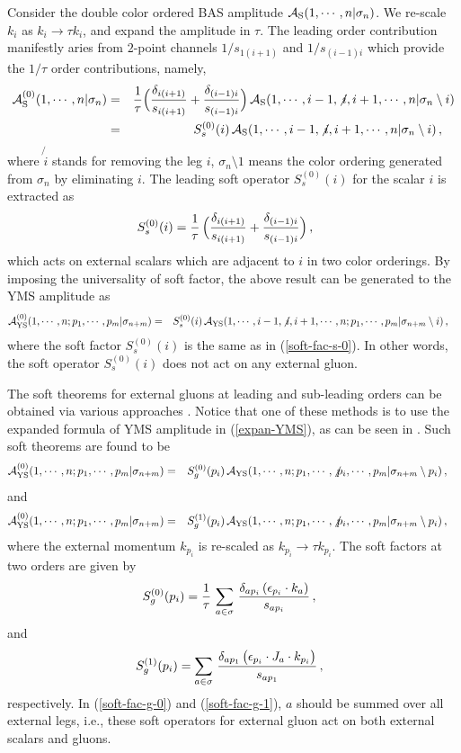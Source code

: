 \documentclass[11pt,a4paper]{article}
\newcommand{\bea}{\begin{eqnarray}}
\newcommand{\eea}{\end{eqnarray}}
\newcommand{\nn}{\nonumber \\}
\def\eref#1{(\ref{#1})}
\begin{document}
Consider the double color ordered BAS amplitude ${\cal A}_{\rm S}(1,\cdots,n|\sigma_n)$. We re-scale $k_i$
as $k_i\to\tau k_i$, and expand the amplitude in $\tau$. The leading order contribution manifestly aries from $2$-point channels $1/s_{1(i+1)}$
and $1/ s_{(i-1)i}$ which provide the $1/\tau$ order contributions, namely,
%
\bea
{\cal A}^{(0)}_{\rm S}(1,\cdots,n|\sigma_n)&=&{1\over \tau}\Big({\delta_{i(i+1)}\over s_{i(i+1)}}+{\delta_{(i-1)i}\over s_{(i-1)i}}\Big)\,
{\cal A}_{\rm S}(1,\cdots,i-1,\not{i},i+1,\cdots,n|\sigma_n\setminus i)\nn
&=&S^{(0)}_s(i)\,{\cal A}_{\rm S}(1,\cdots,i-1,\not{i},i+1,\cdots,n|\sigma_n\setminus i)\,,~~~\label{soft-theo-s}
\eea
%
where $\not{i}$ stands for removing the leg $i$, $\sigma_n\setminus1$ means the color ordering generated from $\sigma_n$ by eliminating $i$. The leading soft operator $S^{(0)}_s(i)$ for the scalar $i$ is extracted as
%
\bea
S^{(0)}_s(i)={1\over \tau}\,\Big({\delta_{i(i+1)}\over s_{i(i+1)}}+{\delta_{(i-1)i}\over s_{(i-1)i}}\Big)\,,~~~~\label{soft-fac-s-0}
\eea
%
which acts on external scalars which are adjacent to $i$ in two color orderings.
By imposing the universality of soft factor, the above result can be generated to the YMS amplitude as
%
\bea
{\cal A}^{(0)}_{\rm YS}(1,\cdots,n;p_1,\cdots,p_m|\sigma_{n+m})
&=&S^{(0)}_s(i)\,{\cal A}_{\rm YS}(1,\cdots,i-1,\not{i},i+1,\cdots,n;p_1,\cdots,p_m|\sigma_{n+m}\setminus i)\,,~~~\label{soft-theo-s}
\eea
%
where the soft factor $S^{(0)}_s(i)$ is the same as in \eref{soft-fac-s-0}. In other words, the soft operator $S^{(0)}_s(i)$ does not act on any external gluon.

The soft theorems for external gluons at leading and sub-leading orders can be obtained via various approaches \cite{Casali:2014xpa,Schwab:2014xua,Afkhami-Jeddi:2014fia,Zhou:2022orv}. Notice that one of these methods is to use the expanded formula of YMS amplitude in \eref{expan-YMS}, as can be seen in \cite{Zhou:2022orv}. Such soft theorems are found to be
%
\bea
{\cal A}^{(0)}_{\rm YS}(1,\cdots,n;p_1,\cdots,p_m|\sigma_{n+m})
&=&S^{(0)}_g(p_i)\,{\cal A}_{\rm YS}(1,\cdots,n;p_1,\cdots,\not{p_i},\cdots,p_m|\sigma_{n+m}\setminus p_i)\,,~~~\label{soft-theo-g0}
\eea
%
and
%
\bea
{\cal A}^{(0)}_{\rm YS}(1,\cdots,n;p_1,\cdots,p_m|\sigma_{n+m})
&=&S^{(1)}_g(p_i)\,{\cal A}_{\rm YS}(1,\cdots,n;p_1,\cdots,\not{p_i},\cdots,p_m|\sigma_{n+m}\setminus p_i)\,,~~~\label{soft-theo-g1}
\eea
%
where the external momentum $k_{p_i}$ is re-scaled as $k_{p_i}\to\tau k_{p_i}$. The soft factors at two orders are given by
%
\bea
S^{(0)}_g(p_i)={1\over\tau}\,\sum_{a\in\sigma}\,{\delta_{ap_i}\,(\epsilon_{p_i}\cdot k_a)\over s_{ap_i}}\,,~~\label{soft-fac-g-0}
\eea
%
and
%
\bea
S^{(1)}_g(p_i)=\sum_{a\in\sigma}\,{\delta_{ap_1}\,\big(\epsilon_{p_i}\cdot J_a\cdot k_{p_i}\big)\over s_{ap_1}}\,,~~\label{soft-fac-g-1}
\eea
%
respectively. In \eref{soft-fac-g-0} and \eref{soft-fac-g-1}, $a$ should be summed over all external legs, i.e., these soft operators for external gluon act on both external scalars and gluons.
\end{document}
